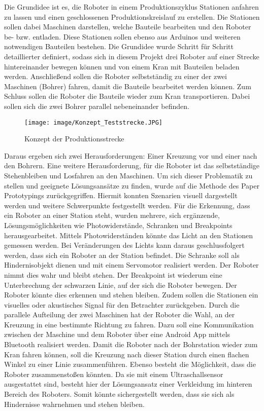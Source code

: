 Die Grundidee ist es, die Roboter in einem Produktionszyklus Stationen anfahren zu lassen und einen geschlossenen Produktionskreislauf zu erstellen. Die Stationen sollen dabei Maschinen darstellen, welche Bauteile bearbeiten und den Roboter be- bzw. entladen. Diese Stationen sollen ebenso aus Arduinos und weiteren notwendigen Bauteilen bestehen. Die Grundidee wurde Schritt für Schritt detaillierter definiert, sodass sich in diesem Projekt drei Roboter auf einer Strecke hintereinander bewegen können und von einem Kran mit Bauteilen beladen werden. Anschließend sollen die Roboter selbstständig zu einer der zwei Maschinen (Bohrer) fahren, damit die Bauteile bearbeitet werden können. Zum Schluss sollen die Roboter die Bauteile wieder zum
Kran transportieren. Dabei sollen sich die zwei Bohrer parallel nebeneinander befinden. 

\begin{figure}[h]
	\begin{center}
		\texttt{[image: image/Konzept\_Teststrecke.JPG]}
		\caption{Konzept der Produktionsstrecke}
		\label{Grundidee}
	\end{center}
\end{figure}

Daraus ergeben sich zwei Herausforderungen: Einer Kreuzung vor und einer nach den Bohrern.
Eine weitere Herausforderung, für die Roboter ist das selbstständige Stehenbleiben und Losfahren an den Maschinen. Um sich dieser Problematik zu stellen und geeignete Lösungsansätze zu finden, wurde auf die Methode des Paper Prototypings zurückgegriffen. Hiermit konnten Szenarien visuell dargestellt werden und weitere Schwerpunkte festgestellt werden. Für die Erkennung, dass ein
Roboter an einer Station steht, wurden mehrere, sich ergänzende, Lösungsmöglichkeiten wie Photowiderstände, Schranken und Breakpoints herausgearbeitet. Mittels Photowiderständen könnte das Licht an den Stationen gemessen werden. Bei Veränderungen des Lichts kann daraus geschlussfolgert werden, dass sich ein Roboter an der Station befindet. Die Schranke soll als Hindernisobjekt dienen und mit einem Servomotor realisiert werden. Der Roboter nimmt dies wahr und bleibt stehen. 
Der Breakpoint ist wiederum eine Unterbrechung der schwarzen Linie, auf der sich die Roboter bewegen. Der Roboter könnte dies erkennen und stehen bleiben. Zudem sollen die Stationen ein visuelles oder akustisches Signal für den Betrachter zurückgeben. Durch die parallele Aufteilung der zwei Maschinen hat der Roboter die Wahl, an der Kreuzung in eine bestimmte Richtung zu fahren. Dazu soll eine Kommunikation zwischen der Maschine und dem Roboter über eine Android App mittels Bluetooth realisiert werden. Damit die Roboter nach der Bohrstation wieder zum Kran fahren können, soll die Kreuzung nach dieser Station durch einen flachen Winkel zu einer Linie zusammenführen. Ebenso besteht die Möglichkeit, dass die Roboter zusammenstoßen könnten. Da sie mit einem Ultraschallsensor ausgestattet sind, besteht hier der Lösungsansatz einer Verkleidung im hinteren Bereich des Roboters. Somit könnte sichergestellt werden, dass sie sich als Hindernisse
wahrnehmen und stehen bleiben.

